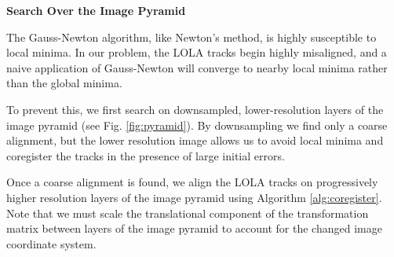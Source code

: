 \documentclass[float=false, crop=false]{standalone}
\begin{document}


{\bf Search Over the Image Pyramid}

The Gauss-Newton algorithm, like Newton's method, is highly susceptible to local minima.
In our problem, the LOLA tracks begin highly misaligned, and a naive application of Gauss-Newton
will converge to nearby local minima rather than the global minima.

To prevent this, we first search
on downsampled, lower-resolution layers of the image pyramid (see Fig. \ref{fig:pyramid}).
By downsampling we find only a coarse alignment, but the lower resolution image allows us to
avoid local minima and coregister the tracks in the presence of large initial errors.

Once a coarse alignment is found, we align the LOLA tracks on progressively higher resolution
layers of the image pyramid using Algorithm \ref{alg:coregister}. Note that we must scale
the translational component of the transformation matrix between layers of the image
pyramid to account for the changed image coordinate system.
\end{document}
